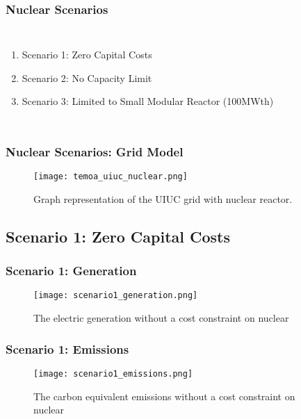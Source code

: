 \begin{frame}
  \frametitle{Nuclear Scenarios}
  \begin{columns}
    \column[t]{3cm}
    \begin{enumerate}
      \item Scenario 1: Zero Capital Costs
      \item Scenario 2: No Capacity Limit
      \item Scenario 3: Limited to Small Modular Reactor (100MWth)
    \end{enumerate}

    \column[t]{7cm}
    \begin{table}
      \centering
      \caption{Summary of Nuclear Scenarios. Costs from EIA and NEI reports \cite{desai_nuclear_2018}\cite{us_department_of_energy_capital_2016}. Assumes
      thermal efficiency of 33\%.}
      \label{table:scenarios}
    \end{table}
  \end{columns}
\end{frame}

\begin{frame}
  \frametitle{Nuclear Scenarios: Grid Model}
  \begin{figure}
    \texttt{[image: temoa\_uiuc\_nuclear.png]}
    \caption{Graph representation of the UIUC grid with nuclear reactor.}
    \label{fig:nuclear-uiuc}
  \end{figure}
\end{frame}


\subsection{Scenario 1: Zero Capital Costs}
\begin{frame}
  \frametitle{Scenario 1: Generation}
    \begin{figure}
      \texttt{[image: scenario1\_generation.png]}
      \caption{The electric generation without a cost constraint on nuclear}
      \label{fig:gen01}
    \end{figure}
\end{frame}
\begin{frame}
  \frametitle{Scenario 1: Emissions}
  \begin{figure}
    \texttt{[image: scenario1\_emissions.png]}
    \caption{The carbon equivalent emissions without a cost constraint on nuclear}
    \label{fig:emit01}
  \end{figure}
\end{frame}
